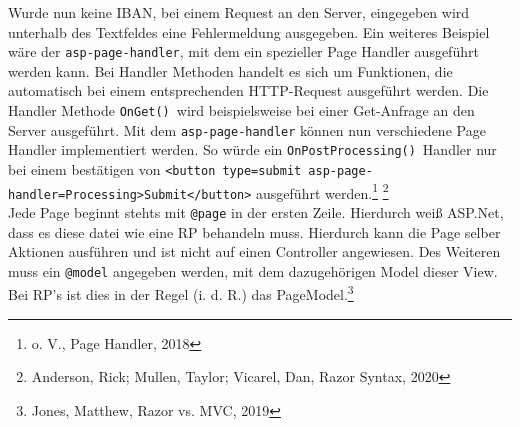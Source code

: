 \documentclass[a4paper,
12pt,
oneside]
{article}
\begin{document}
	Wurde nun keine IBAN, bei einem Request an den Server, eingegeben wird unterhalb des Textfeldes eine Fehlermeldung ausgegeben. Ein weiteres Beispiel wäre der \texttt{asp-page-handler}, mit dem ein spezieller Page Handler ausgeführt werden kann. Bei Handler Methoden handelt es sich um Funktionen, die automatisch bei einem entsprechenden HTTP-Request ausgeführt werden. Die Handler Methode \texttt{OnGet()}~wird beispielsweise bei einer Get-Anfrage an den Server ausgeführt. Mit dem \texttt{asp-page-handler} können nun verschiedene Page Handler implementiert werden. So würde ein  \texttt{OnPostProcessing()}~Handler nur bei einem bestätigen von \texttt{<button type=\glqq submit\grqq~asp-page-handler=\glqq Processing\grqq>Submit</button>} ausgeführt werden.\footnote{o. V., Page Handler, 2018} \footnote{Anderson, Rick; Mullen, Taylor; Vicarel, Dan, Razor Syntax, 2020} \\
	Jede Page beginnt stehts mit \texttt{@page} in der ersten Zeile. Hierdurch weiß ASP.Net, dass es diese datei wie eine RP behandeln muss. Hierdurch kann die Page selber Aktionen ausführen und ist nicht auf einen Controller angewiesen. Des Weiteren muss ein \texttt{@model} angegeben werden, mit dem dazugehörigen Model dieser View. Bei RP's ist dies in der Regel (i. d. R.) das PageModel.\footnote{Jones, Matthew, Razor vs. MVC, 2019}
	
	
	
\end{document}
